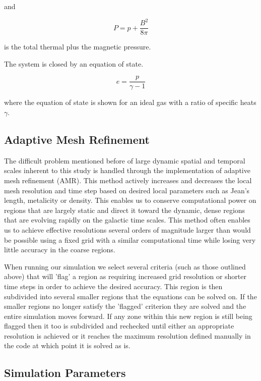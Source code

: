 and

\begin{equation} \label{eq:P-total}
P = p + \frac{B^2}{8\pi}
\end{equation}

is the total thermal plus the magnetic pressure.

The system is closed by an equation of state.

\begin{equation} \label{eq:EOS}
e = \frac{p}{\gamma - 1}
\end{equation}

where the equation of state is shown for an ideal gas with a ratio of specific
heats $\gamma$.
\subsection{Adaptive Mesh Refinement}
The difficult problem mentioned before of large dynamic spatial and temporal
scales inherent to this study is handled through the implementation of adaptive
mesh refinement (AMR). This method actively increases and decreases the 
local mesh resolution and time step based on desired local parameters such as
Jean's length, metalicity or density. This enables us to conserve computational
power on regions that are largely static and direct it toward the dynamic, dense
regions that are evolving rapidly on the galactic time scales. This method often
enables us to achieve effective resolutions several orders of magnitude larger
than would be possible using a fixed grid with a similar computational time
while losing very little accuracy in the coarse regions. 

When running our simulation we select several criteria (such as those outlined
above) that will 'flag' a region as requiring increased grid resolution or
shorter time steps in order to achieve the desired accuracy. This region is then
subdivided into several smaller regions that the equations can be solved on. If
the smaller regions no longer satisfy the 'flagged' criterion they are solved
and the entire simulation moves forward. If any zone within this new region is
still being flagged then it too is subdivided and rechecked until either an
appropriate resolution is achieved or it reaches the maximum resolution defined
manually in the code at which point it is solved as is. 

\subsection{Simulation Parameters}

